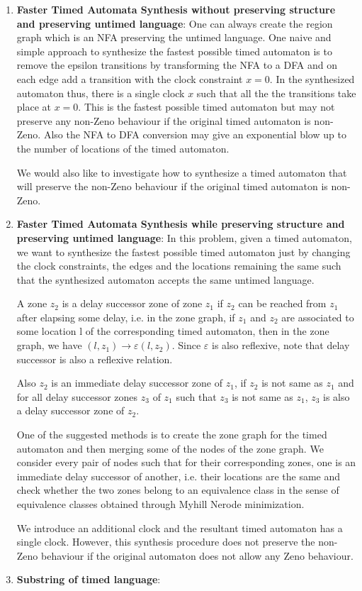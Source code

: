 \begin{enumerate}
\item \textbf{Faster Timed Automata Synthesis without preserving structure and preserving untimed language}: One can always create the region graph which is an NFA preserving the untimed language. One naive and simple approach to synthesize the fastest possible timed automaton is to remove the epsilon transitions by transforming the NFA to a DFA and on each edge add a transition with the clock constraint $x=0$. In the synthesized automaton thus, there is a single clock $x$ such that all the the transitions take place at $x= 0$. This is the fastest possible timed automaton but may not preserve any non-Zeno behaviour if the original timed automaton  is non-Zeno. Also the NFA to DFA conversion may give an exponential blow up to the number of locations of the timed automaton.

We would also like to investigate how to synthesize a timed automaton that will preserve the non-Zeno behaviour if the original timed automaton is non-Zeno.

\item \textbf{Faster Timed Automata Synthesis while preserving structure and preserving untimed language}: In this problem, given a timed automaton, we want to synthesize the fastest possible timed automaton just by changing the clock constraints, the edges and the locations remaining the same such that the synthesized automaton accepts the same untimed language.

\begin{definition}
A zone $z_2$ is a delay successor zone of zone $z_1$ if $z_2$ can be reached from $z_1$ after elapsing some delay, i.e. in the zone graph, if $z_1$ and $z_2$ are associated to some location l of the corresponding timed automaton, then in the zone graph, we have $(l, z_1) \to{\varepsilon} (l, z_2)$.
Since $\varepsilon$ is also reflexive, note that delay successor is also a reflexive relation.

Also $z_2$ is an immediate delay successor zone of $z_1$, if $z_2$ is not same as $z_1$ and for all delay successor zones $z_3$ of $z_1$ such that $z_3$ is not same as $z_1$, $z_3$ is also a delay successor zone of $z_2$.
\end{definition}

One of the suggested methods is to create the zone graph for the timed automaton and then merging some of the nodes of the zone graph. We consider every pair of nodes such that for their corresponding zones, one is an immediate delay successor of another, i.e. their locations are the same and check whether the two zones belong to an equivalence class in the sense of equivalence classes obtained through Myhill Nerode minimization.

We introduce an additional clock and the resultant timed automaton has a single clock. However, this synthesis procedure does not preserve the non-Zeno behaviour if the original automaton does not allow any Zeno behaviour.

\item \textbf{Substring of timed language}: 

\end{enumerate}